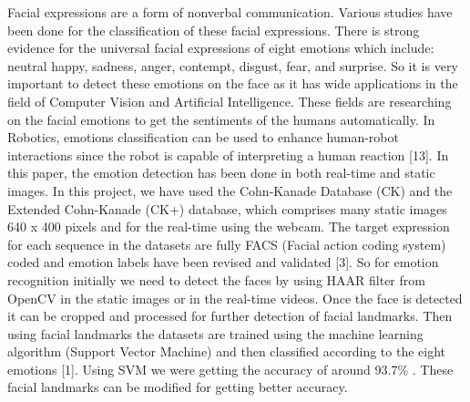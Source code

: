 \documentclass[a4paper,12pt,oneside]{article}
\begin{document}
Facial expressions are a form of nonverbal
communication. Various studies have been done for the
classification of these facial expressions. There is strong
evidence for the universal facial expressions of eight
emotions which include: neutral happy, sadness, anger,
contempt, disgust, fear, and surprise. So it is very
important to detect these emotions on the face as it has
wide applications in the field of Computer Vision and
Artificial Intelligence. These fields are researching on
the facial emotions to get the sentiments of the humans
automatically. In Robotics, emotions classification can
be used to enhance human-robot interactions since the
robot is capable of interpreting a human reaction [13]. In
this paper, the emotion detection has been done in both
real-time and static images. In this project, we have used
the Cohn-Kanade Database (CK) and the Extended
Cohn-Kanade (CK+) database, which comprises many
static images 640 x 400 pixels and for the real-time using
the webcam. The target expression for each sequence in
the datasets are fully FACS (Facial action coding
system) coded and emotion labels have been revised and
validated [3]. So for emotion recognition initially we
need to detect the faces by using HAAR filter from
OpenCV in the static images or in the real-time videos.
Once the face is detected it can be cropped and processed
for further detection of facial landmarks. Then using
facial landmarks the datasets are trained using the
machine learning algorithm (Support Vector Machine)
and then classified according to the eight emotions [1].
Using SVM we were getting the accuracy of around
93.7\% . These facial landmarks can be modified for
getting better accuracy.
\setlength{\baselineskip}{1.0\baselineskip}
\newpage
\begin{center}
\tableofcontents
\end{center}
\newpage
\thispagestyle{plain}
\end{document}
